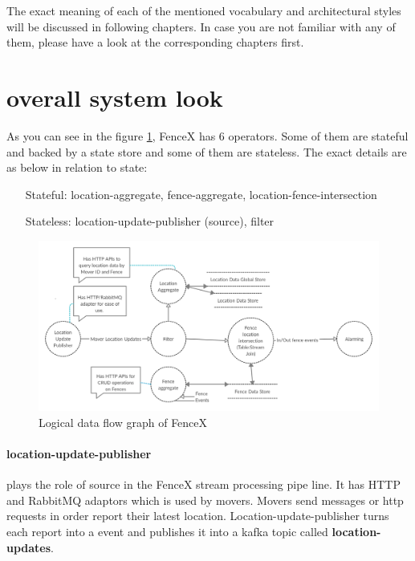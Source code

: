 \documentclass[a4]{report}
\begin{document}
    The exact meaning of each of the mentioned vocabulary and architectural styles will be discussed in following chapters. In case you are not familiar with any of them, please have a look at the corresponding chapters first.

    \section{overall system look}
    As you can see in the figure \ref{fig:logical-dfg}, FenceX has 6 operators. Some of them are stateful and backed by a state store and some of them are stateless.
    The exact details are as below in relation to state:

    \begin{itemize}
        \item[Stateful:] location-aggregate, fence-aggregate, location-fence-intersection
        \item[Stateless:] location-update-publisher (source), filter
    \end{itemize}

    \begin{figure}[ht]
        \caption{Logical data flow graph of FenceX}
        \label{fig:logical-dfg}
        \includegraphics[scale=0.2]{images/logical-data-flow-diagram.png}
       
    \end{figure}

    \paragraph{location-update-publisher} plays the role of source in the FenceX stream processing pipe line.
    It has HTTP and RabbitMQ adaptors which is used by movers.
    Movers send messages or http requests in order report their latest location.
    Location-update-publisher turns each report into a event and publishes it into a kafka topic called \textbf{location-updates}.
\end{document}
